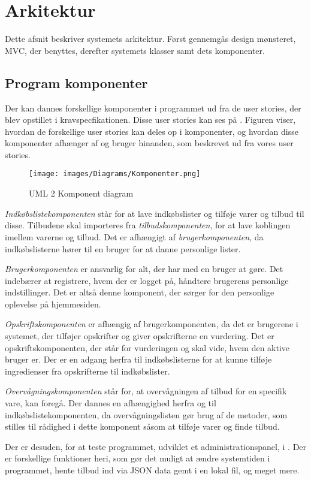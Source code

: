 \section{Arkitektur}
Dette afsnit beskriver systemets arkitektur.
Først gennemgås design mønsteret, MVC, der benyttes, derefter systemets klasser samt dets komponenter.



\subsection{Program komponenter}\label{subsec:komp}
Der kan dannes forskellige komponenter i programmet ud fra de user stories, der blev opstillet i kravspecfikationen.
Disse user stories kan ses på .
Figuren viser, hvordan de forskellige user stories kan deles op i komponenter, og hvordan disse komponenter afhænger af og bruger hinanden, som beskrevet ud fra vores user stories.

\begin{figure}
	\vspace{-20pt}
	\begin{center}
		\texttt{[image: images/Diagrams/Komponenter.png]}
	\end{center}
	\vspace{-20pt}
	\caption{UML 2 Komponent diagram }\label{figure:komp}
	\vspace{-20pt}
\end{figure}

\textit{Indkøbslistekomponenten} står for at lave indkøbslister og tilføje varer og tilbud til disse.
Tilbudene skal importeres fra \textit{tilbudskomponenten}, for at lave koblingen imellem varerne og tilbud.
Det er afhængigt af \textit{brugerkomponenten}, da indkøbslisterne hører til en bruger for at danne personlige lister. 

\textit{Brugerkomponenten} er ansvarlig for alt, der har med en bruger at gøre. 
Det indebærer at registrere, hvem der er logget på, håndtere brugerens personlige indstillinger. 
Det er altså denne komponent, der sørger for den personlige oplevelse på hjemmesiden.

\textit{Opskriftskomponenten} er afhængig af brugerkomponenten, da det er brugerene i systemet, der tilføjer opskrifter og giver opskrifterne en vurdering.
Det er opskriftskomponenten, der står for vurderingen og skal vide, hvem den aktive bruger er.
Der er en adgang herfra til indkøbslisterne for at kunne tilføje ingredienser fra opskrifterne til indkøbslister.

\textit{Overvågningskomponenten} står for, at overvågningen af tilbud for en specifik vare, kan foregå.
Der dannes en afhængighed herfra og til indkøbslistekomponenten, da overvågningslisten gør brug af de metoder, som stilles til rådighed i dette komponent såsom at tilføje varer og finde tilbud.

Der er desuden, for at teste programmet, udviklet et administrationspanel, i . 
Der er forskellige funktioner heri, som gør det muligt at ændre systemtiden i programmet, hente tilbud ind via JSON data gemt i en lokal fil, og meget mere.


